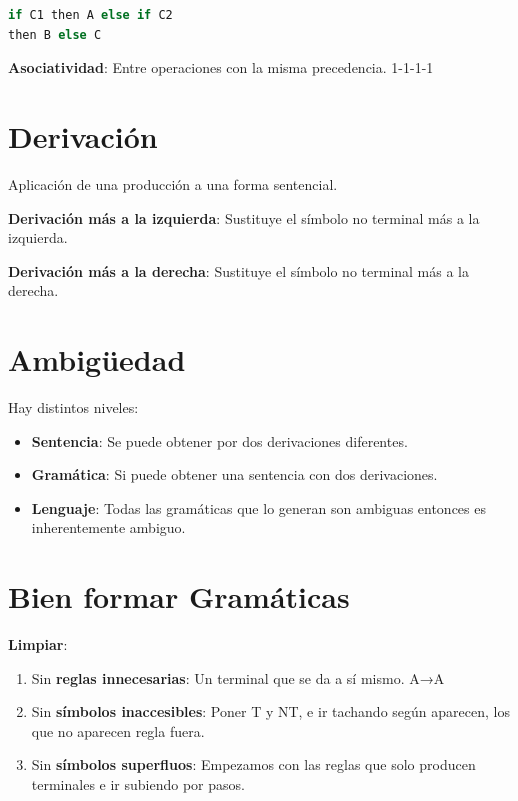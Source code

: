 \documentclass[12pt, twoside, openright]{report} %
\begin{document}
\begin{lstlisting}[language=C]
if C1 then A else if C2
then B else C
\end{lstlisting}

\textbf{Asociatividad}: Entre operaciones con la misma precedencia.
1-1-1-1


\section{Derivación}

Aplicación de una producción a una forma sentencial.

\textbf{Derivación más a la izquierda}: Sustituye el símbolo no terminal
más a la izquierda.

\textbf{Derivación más a la derecha}: Sustituye el símbolo no terminal
más a la derecha.


\section{Ambigüedad}

Hay distintos niveles:

\begin{itemize}

\item
  \textbf{Sentencia}: Se puede obtener por dos derivaciones diferentes.
\item
  \textbf{Gramática}: Si puede obtener una sentencia con dos
  derivaciones.
\item
  \textbf{Lenguaje}: Todas las gramáticas que lo generan son ambiguas
  entonces es inherentemente ambiguo.
\end{itemize}


\section{Bien formar Gramáticas}

\textbf{Limpiar}:

\begin{enumerate}
\def\labelenumi{\arabic{enumi}.}
\item
  Sin \textbf{reglas innecesarias}: Un terminal que se da a sí mismo.
  A→A
\item
  Sin \textbf{símbolos inaccesibles}: Poner T y NT, e ir tachando según
  aparecen, los que no aparecen regla fuera.
\item
  Sin \textbf{símbolos superfluos}: Empezamos con las reglas que solo
  producen terminales e ir subiendo por pasos.
\end{enumerate}
\end{document}
